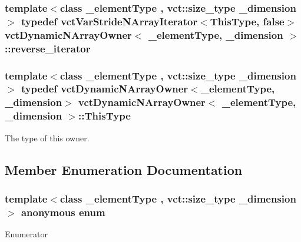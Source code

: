 \hypertarget{classvct_dynamic_n_array_owner_a9b4b9b8c6f7e3cfe9bdf9aedbdda6f0d}{
\subsubsection[{reverse\-\_\-iterator}]{\setlength{\rightskip}{0pt plus 5cm}template$<$class \-\_\-element\-Type , vct\-::size\-\_\-type \-\_\-dimension$>$ typedef {\bf vct\-Var\-Stride\-N\-Array\-Iterator}$<${\bf This\-Type}, false$>$ {\bf vct\-Dynamic\-N\-Array\-Owner}$<$ \-\_\-element\-Type, \-\_\-dimension $>$\-::{\bf reverse\-\_\-iterator}}}\label{classvct_dynamic_n_array_owner_a9b4b9b8c6f7e3cfe9bdf9aedbdda6f0d}
\hypertarget{classvct_dynamic_n_array_owner_ad221bdc6a1c33632b48777a685da9036}{
\subsubsection[{This\-Type}]{\setlength{\rightskip}{0pt plus 5cm}template$<$class \-\_\-element\-Type , vct\-::size\-\_\-type \-\_\-dimension$>$ typedef {\bf vct\-Dynamic\-N\-Array\-Owner}$<$\-\_\-element\-Type, \-\_\-dimension$>$ {\bf vct\-Dynamic\-N\-Array\-Owner}$<$ \-\_\-element\-Type, \-\_\-dimension $>$\-::{\bf This\-Type}}}\label{classvct_dynamic_n_array_owner_ad221bdc6a1c33632b48777a685da9036}
The type of this owner. 

\subsection{Member Enumeration Documentation}
\hypertarget{classvct_dynamic_n_array_owner_a0f4131a70f9365b60085fd16ce0e2f69}{\subsubsection[{anonymous enum}]{\setlength{\rightskip}{0pt plus 5cm}template$<$class \-\_\-element\-Type , vct\-::size\-\_\-type \-\_\-dimension$>$ anonymous enum}}\label{classvct_dynamic_n_array_owner_a0f4131a70f9365b60085fd16ce0e2f69}
\begin{Desc}
\item[Enumerator]\par
\begin{description}
\item[{\em 
\hypertarget{classvct_dynamic_n_array_owner_a0f4131a70f9365b60085fd16ce0e2f69a095e29919b35ca1549f2ff0d092d9116}{D\-I\-M\-E\-N\-S\-I\-O\-N}\label{classvct_dynamic_n_array_owner_a0f4131a70f9365b60085fd16ce0e2f69a095e29919b35ca1549f2ff0d092d9116}
}]\end{description}
\end{Desc}


